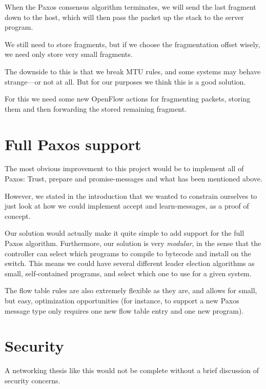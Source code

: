 When the Paxos consensus algorithm terminates, we will send the last
fragment down to the host, which will then pass the packet up the stack to
the server program.

We still need to store fragments, but if we choose the fragmentation offset
wisely, we need only store very small fragments.

The downside to this is that we break MTU rules, and some systems may behave
strange---or not at all.  But for our purposes we think this is a good
solution.

For this we need some new OpenFlow actions for fragmenting packets, storing
them and then forwarding the stored remaining fragment.

\section{Full Paxos support}

The most obvious improvement to this project would be to implement all of
Paxos: Trust, prepare and promise-messages and what has been mentioned
above.

However, we stated in the introduction that we wanted to constrain ourselves
to just look at how we could implement accept and learn-messages, as a
proof of concept.

Our solution would actually make it quite simple to add support for the full
Paxos algorithm.  Furthermore, our solution is very \textit{modular}, in the
sense that the controller can select which programs to compile to bytecode
and install on the switch.  This means we could have several different
leader election algorithms as small, self-contained programs, and select
which one to use for a given system.

The flow table rules are also extremely flexible as they are, and allows for
small, but easy, optimization opportunities (for instance, to support a new
Paxos message type only requires one new flow table entry and one new
program).


\section{Security}

A networking thesis like this would not be complete without a brief
discussion of security concerns.

